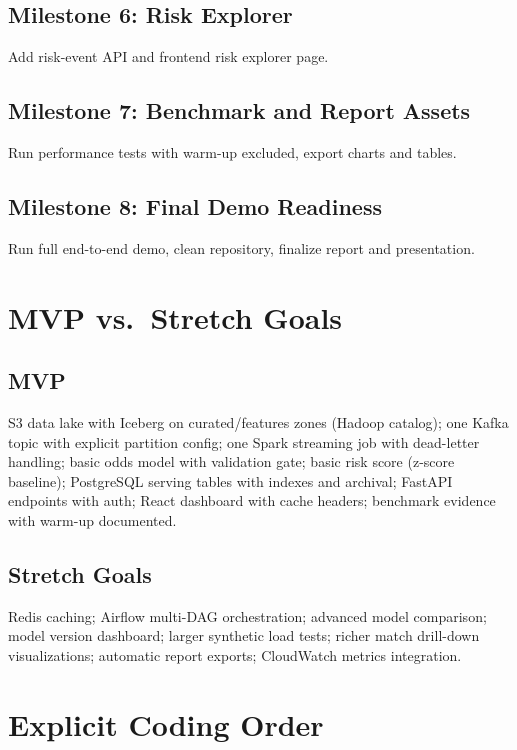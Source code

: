 \documentclass[11pt,a4paper]{article}
\begin{document}
\subsection{Milestone 6: Risk Explorer}
Add risk-event API and frontend risk explorer page.

\subsection{Milestone 7: Benchmark and Report Assets}
Run performance tests with warm-up excluded, export charts and tables.

\subsection{Milestone 8: Final Demo Readiness}
Run full end-to-end demo, clean repository, finalize report and presentation.

\section{MVP vs.\ Stretch Goals}

\subsection{MVP}

S3 data lake with Iceberg on curated/features zones (Hadoop catalog); one Kafka topic with
explicit partition config; one Spark streaming job with dead-letter handling; basic odds model
with validation gate; basic risk score (z-score baseline); PostgreSQL serving tables with indexes
and archival; FastAPI endpoints with auth; React dashboard with cache headers; benchmark evidence
with warm-up documented.

\subsection{Stretch Goals}

Redis caching; Airflow multi-DAG orchestration; advanced model comparison; model version
dashboard; larger synthetic load tests; richer match drill-down visualizations; automatic report
exports; CloudWatch metrics integration.

\section{Explicit Coding Order}
\end{document}
